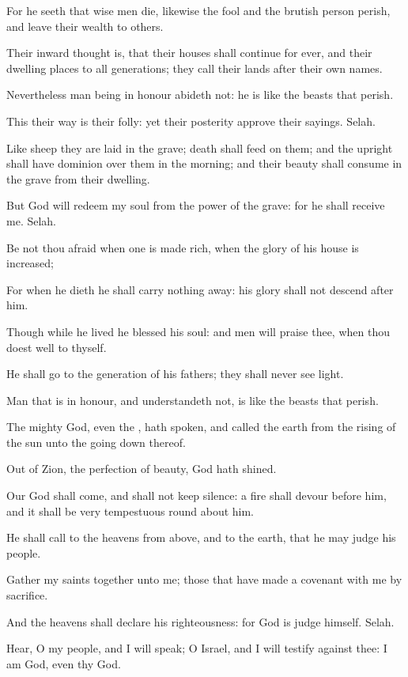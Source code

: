 \Verse For he seeth that wise men die, likewise the fool and the brutish person perish, and leave their wealth to others.

\Verse Their inward thought is, that their houses shall continue for ever, and their dwelling places to all generations; they call their lands after their own names.

\Verse Nevertheless man being in honour abideth not: he is like the beasts that perish.

\Verse This their way is their folly: yet their posterity approve their sayings. Selah.

\Verse Like sheep they are laid in the grave; death shall feed on them; and the upright shall have dominion over them in the morning; and their beauty shall consume in the grave from their dwelling.

\Verse But God will redeem my soul from the power of the grave: for he shall receive me. Selah.

\Verse Be not thou afraid when one is made rich, when the glory of his house is increased;

\Verse For when he dieth he shall carry nothing away: his glory shall not descend after him.

\Verse Though while he lived he blessed his soul: and men will praise thee, when thou doest well to thyself.

\Verse He shall go to the generation of his fathers; they shall never see light.

\Verse Man that is in honour, and understandeth not, is like the beasts that perish.




\Chapter
\Verse The mighty God, even the \LORD, hath spoken, and called the earth from the rising of the sun unto the going down thereof.

\Verse Out of Zion, the perfection of beauty, God hath shined.

\Verse Our God shall come, and shall not keep silence: a fire shall devour before him, and it shall be very tempestuous round about him.

\Verse He shall call to the heavens from above, and to the earth, that he may judge his people.

\Verse Gather my saints together unto me; those that have made a covenant with me by sacrifice.

\Verse And the heavens shall declare his righteousness: for God is judge himself. Selah.

\Verse Hear, O my people, and I will speak; O Israel, and I will testify against thee: I am God, even thy God.

